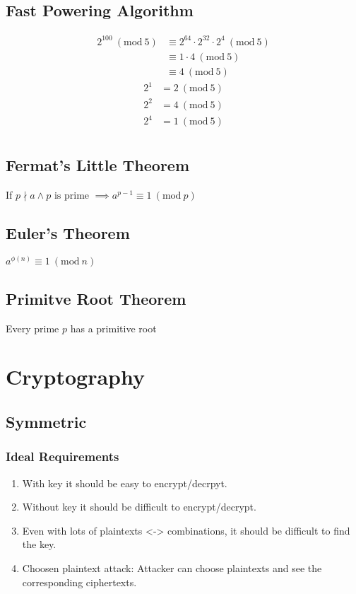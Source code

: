 \documentclass{article}
\newcommand{\Mod}[1]{\ (\mathrm{mod}\ #1)}
\begin{document}
\begin{multicols*}{2}
    \subsection*{Fast Powering Algorithm}
    \begin{multicols*}{2}
        \begin{align*}
            2^{100} \Mod{5} & \equiv 2^{64} \cdot 2^{32} \cdot 2^{4} \Mod{5} \\
                            & \equiv 1 \cdot 4 \Mod{5}                       \\
                            & \equiv 4 \Mod{5}
        \end{align*}
        \columnbreak
        \begin{align*}
            2^1 & = 2 \Mod{5} \\
            2^2 & = 4 \Mod{5} \\
            2^4 & = 1 \Mod{5} \\
        \end{align*}
    \end{multicols*}
    \subsection*{Fermat's Little Theorem}
    If \(p \nmid a \land p \text{ is prime } \implies a^{p-1} \equiv 1\Mod{p}\)
    \subsection*{Euler's Theorem}
    \(a^{\phi{(n)}} \equiv 1 \Mod{n}\)
    \subsection*{Primitve Root Theorem}
    Every prime \(p\) has a primitive root
    \section*{Cryptography}
    \subsection*{Symmetric}
    \subsubsection*{Ideal Requirements}
    \begin{enumerate}[label=\arabic*)]
        \item With key it should be easy to encrypt/decrpyt.
        \item Without key it should be difficult to encrypt/decrypt.
        \item Even with lots of plaintexts <-> combinations, it should be difficult to find the key.
        \item Choosen plaintext attack: Attacker can choose plaintexts and see the corresponding ciphertexts.
    \end{enumerate}

\end{multicols*}
\end{document}
